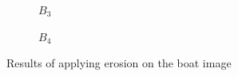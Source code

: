\documentclass[12pt]{article}
\renewcommand{\subfiguresize}{.25\textwidth}
\begin{document}
\begin{figure}[H]
\begin{subfigure}[t]{\subfiguresize}
        \caption{$B_3$}
    \end{subfigure}
    \hspace{2em}
    \begin{subfigure}[t]{\subfiguresize}\centering
        \caption{$B_4$}
    \end{subfigure}
    \hspace{2em}
    \caption{Results of applying erosion on the boat image}
\end{figure} 
\end{document}
